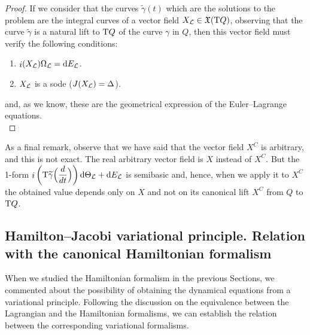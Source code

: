\documentclass[12pt]{report}
\def\dst{\displaystyle}
\def\qed{\ifvmode\removelastskip\fi
{\unskip\nobreak\hfil\penalty50\hbox{}\nobreak\hfil
\hbox{\vrule height1.2ex width1.2ex}\parfillskip=0pt
\finalhyphendemerits=0 \par\smallskip}}
\def\vf{\mathfrak X}
\def\Lag{{\cal L}}
\def\d{{\rm d}}
\def\Tan{{\rm T}}
\def\inn{\mathop{i}\nolimits}
\begin{document}
\begin{proof}
If we consider that the curves  $\widetilde  \gamma (t)$
which are the solutions to the problem are the integral curves of a vector field
$X_\Lag\in\vf(\Tan Q)$, observing that
the curve $\widetilde\gamma$ is a natural lift
to $\Tan Q$ of the curve $\gamma$ in $Q$, then this vector field must verify the following conditions:
\begin{enumerate}
\item
$\inn (X_\Lag )\Omega_\Lag =\d E_\Lag$.
\item
$X_\Lag$ is a {\sc sode} ($J(X_\Lag )=\Delta$).
\end{enumerate}
and, as we know, these are the geometrical expression of the Euler--Lagrange equations.
\\ \qed \end{proof}

As a final remark, observe that we have said that the vector field $X^C$ is arbitrary, and this is not exact. The real arbitrary vector field is $X$ instead of $X^C$. But the 1-form
\(\dst\inn\left(\Tan\widetilde\gamma\Big(\frac{d}{d t}\Big)\right)\d\Theta_\Lag +
\d E_\Lag\)
is semibasic and, hence, when we apply it to $X^C$ the obtained value depends only on $X$ and not on its canonical lift
 $X^C$ from $Q$ to $\Tan Q$.


\subsection{Hamilton--Jacobi variational principle. Relation with the canonical Hamiltonian formalism}
\label{hamvariational}


When we studied the Hamiltonian formalism in the previous Sections,
we commented about the possibility of obtaining the dynamical equations from a variational principle. 
Following the discussion on the equivalence between the Lagrangian and the Hamiltonian formalisms,
we can establish the relation between the corresponding variational formalisms.
\end{document}
